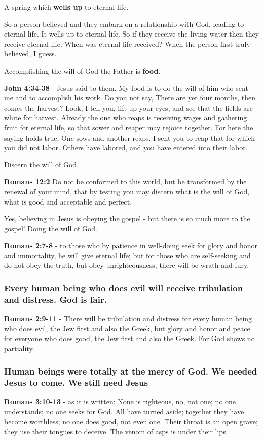 \documentclass[11pt]{article}
\begin{document}
A spring which \textbf{wells up} to eternal life.

So a person believed and they embark on a relationship with God, leading to eternal life.
It wells-up to eternal life. So if they receive the living water then they receive eternal life.
When was eternal life received? When the person first truly believed, I guess.

Accomplishing the will of God the Father is \textbf{food}.

\textbf{John 4:34-38} - Jesus said to them, My food is to do the will of him who sent me and to accomplish his work. Do you not say, There are yet four months, then comes the harvest? Look, I tell you, lift up your eyes, and see that the fields are white for harvest. Already the one who reaps is receiving wages and gathering fruit for eternal life, so that sower and reaper may rejoice together. For here the saying holds true, One sows and another reaps. I sent you to reap that for which you did not labor. Others have labored, and you have entered into their labor.

Discern the will of God.

\textbf{Romans 12:2} Do not be conformed to this world, but be transformed by the renewal of your mind, that by testing you may discern what is the will of God, what is good and acceptable and perfect.

Yes, believing in Jesus is obeying the gospel - but there is so much more to the gospel! Doing the will of God.

\textbf{Romans 2:7-8} - to those who by patience in well-doing seek for glory and honor and immortality, he will give eternal life; but for those who are self-seeking and do not obey the truth, but obey unrighteousness, there will be wrath and fury.

\subsubsection{Every human being who does evil will receive tribulation and distress. God is fair.}
\label{sec:org7b2a6db}
\textbf{Romans 2:9-11} - There will be tribulation and distress for every human being who does evil, the Jew first and also the Greek, but glory and honor and peace for everyone who does good, the Jew first and also the Greek. For God shows no partiality.

\subsubsection{Human beings were totally at the mercy of God. We needed Jesus to come. We still need Jesus}
\label{sec:orgcbe6c81}
\textbf{Romans 3:10-13} - as it is written: None is righteous, no, not one; no one understands; no one seeks for God.  All have turned aside; together they have become worthless; no one does good, not even one.  Their throat is an open grave; they use their tongues to deceive. The venom of asps is under their lips.
\end{document}

